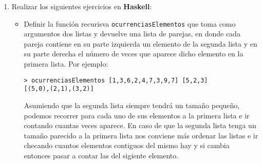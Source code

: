 \documentclass{article}
\begin{document}
\begin{enumerate}
      Primero se define la variable \texttt{c} como falso, luego tenemos una suma, entonces evaluamos la suma
      iniciando por lo más anidado la parte izquierda. El \texttt{let/cc} nos devuelve 4, entonces ya podemos hacer la suma.
      \begin{verbatim}
> (+ 1 (+ 2 (+ 3 (+ 4 5))))
> (+ 1 (+ 2 (+ 3 9)))
> (+ 1 (+ 2 12))
> (+ 1 14)
> 15
      \end{verbatim}

      También tenemos que guarda la continuación en \texttt{c}
      $$(\lambda_\uparrow(v) \ (+ \ 1 \ (+ \ 2 \ (+ \ 3 \ (+ \ v \ 5)))))$$

      Entonces al evaluar \texttt{c 10} nos queda
      \begin{verbatim}
> (c 10)
> ((|$\lambda_\uparrow(v)$| (+ 1 (+ 2 (+ 3 (+ v 5))))) 10)
> (+ 1 (+ 2 (+ 3 (+ 10 5))))
> (+ 1 (+ 2 (+ 3 15)))
> (+ 1 (+ 2 18))
> (+ 1 20)
> 21
      \end{verbatim}

\clearpage
    \item Realizar los siguientes ejercicios en \textbf{Haskell}:
      \begin{itemize}
        \item Definir la función recurisva \texttt{ocurrenciasElementos} que toma como argumentos dos listas y devuelve una
          lista de parejas, en donde cada pareja contiene en su parte izquierda un elemento de la segunda lista y
          en su parte derecha el número de veces que aparece dicho elemento en la primera lista. Por ejemplo:
          \begin{verbatim}
> ocurrenciasElementos [1,3,6,2,4,7,3,9,7] [5,2,3]
[(5,0),(2,1),(3,2)]
          \end{verbatim}

          Asumiendo que la segunda lista siempre tendrá un tamaño pequeño, podemos recorrer para cada uno de sus elementos
          a la primera lista e ir contando cuantas veces aparece. En caso de que la segunda lista tenga un tamaño parecido
          a la primera lista nos conviene más ordenar las listas e ir checando cuantos elementos contiguos del mismo hay y si
          cambia entonces pasar a contar las del sigiente elemento.

          \inputminted[style=pastie,fontsize=\small]{haskell}{ej3_1.hs}


\end{itemize}
\end{enumerate}
\end{document}
